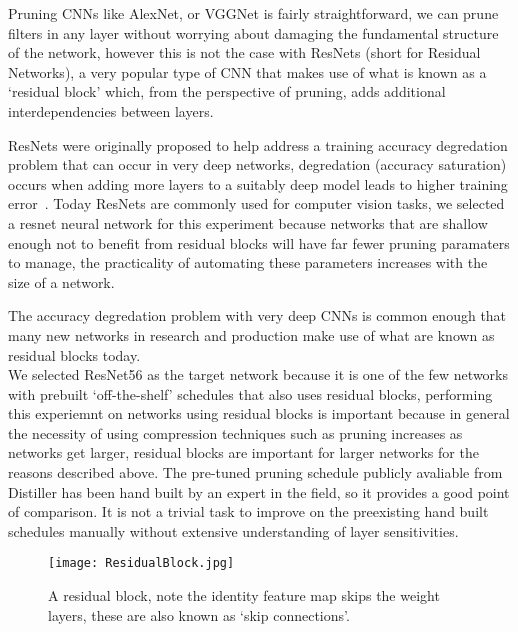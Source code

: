 \documentclass[../Dissertation.tex]{subfiles}
\begin{document}
Pruning CNNs like AlexNet, or VGGNet is fairly straightforward, we can prune filters in any layer without worrying about damaging the fundamental structure of the network, however this is not the case with ResNets (short for Residual Networks),  a very popular type of CNN that makes use of what is known as a `residual block' which, from the perspective of pruning, adds additional interdependencies between layers.

ResNets were originally proposed to help address a training accuracy degredation problem that can occur in very deep networks, degredation (accuracy saturation) occurs when adding more layers to a suitably deep model leads to higher training error~\autocite{heDeepResidualLearning2016}.
Today ResNets are commonly used for computer vision tasks, we selected a resnet neural network for this experiment because networks that are shallow enough not to benefit from residual blocks will have far fewer pruning paramaters to manage, the practicality of automating these parameters increases with the size of a network. 

The accuracy degredation problem with very deep CNNs is common enough that many new networks in research and production make use of what are known as residual blocks today.\\

We selected ResNet56 as the target network because it is one of the few networks with prebuilt `off-the-shelf' schedules that also uses residual blocks, performing this experiemnt on networks using residual blocks is important because in general the necessity of using compression techniques such as pruning increases as networks get larger, residual blocks are important for larger networks for the reasons described above. 
The pre-tuned pruning schedule publicly avaliable from Distiller has been hand built by an expert in the field, so it provides a good point of comparison.
It is not a trivial task to improve on the preexisting hand built schedules manually without extensive understanding of layer sensitivities.  

\begin{figure}[h]
    \centering
    \texttt{[image: ResidualBlock.jpg]}
    \caption{A residual block, note the identity feature map skips the weight layers, these are also known as `skip connections'.}
    \label{fig:ResidualBlock}
\end{figure}

\end{document}
